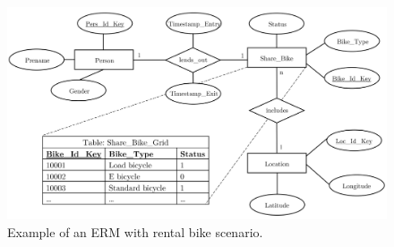 \begin{figure}[!hb]
	\centering
	\includegraphics[scale=0.6]{ERMexample}
	\caption{Example of an ERM with rental bike scenario.}
\end{figure}


